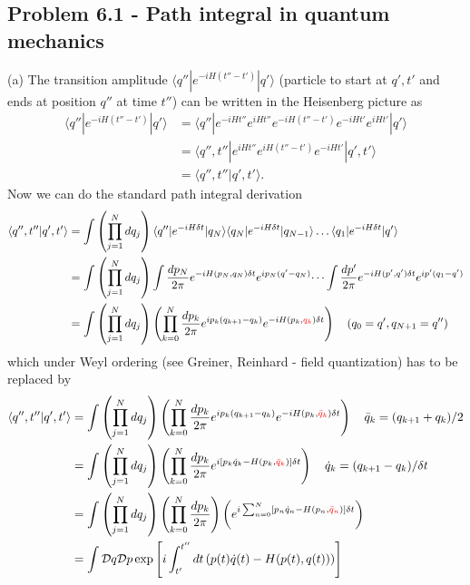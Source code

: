\documentclass[../main.tex]{subfiles}
\begin{document}
\subsection{Problem 6.1 - Path integral in quantum mechanics}
(a) The transition amplitude $\langle q''|e^{-iH(t''-t')}|q'\rangle$ (particle to start at $q',t'$ and ends at position $q''$ at time $t''$) can be written in the Heisenberg picture as
\begin{align}
    \langle q''|e^{-iH(t''-t')}|q'\rangle
    &=\langle q''|e^{-iHt''}e^{iHt''}e^{-iH(t''-t')}e^{-iHt'}e^{iHt'}|q'\rangle\\
    &=\langle q'',t''|e^{iHt''}e^{iH(t''-t')}e^{-iHt'}|q',t'\rangle\\
    &=\langle q'',t''|q',t'\rangle.
\end{align}
Now we can do the standard path integral derivation
\begin{align}
    \langle q'',t''|q',t'\rangle
    &=\int\left(\prod_{j=1}^N dq_j\right) \langle q''|e^{-iH\delta t}|q_N\rangle \langle q_N|e^{-iH\delta t}|q_{N-1}\rangle \dots \langle q_1|e^{-iH\delta t}|q'\rangle\\
    &=\int\left(\prod_{j=1}^N dq_j\right) \int\frac{dp_N}{2\pi}e^{-iH(p_N,q_N)\delta t}e^{ip_N(q'-q_N)} \dots  \int\frac{dp'}{2\pi}e^{-iH(p',q')\delta t}e^{ip'(q_1-q')}\\
    &=\int\left(\prod_{j=1}^N dq_j\right)\left(\prod_{k=0}^{N}\frac{dp_k}{2\pi} e^{ip_k(q_{k+1}-q_k)}e^{-iH(p_k,\textcolor{red}{q_k})\delta t}\right)\quad(q_0=q',q_{N+1}=q'')
\end{align}
which under Weyl ordering (see Greiner, Reinhard - field quantization) has to be replaced by
\begin{align}
    \langle q'',t''|q',t'\rangle
    &=\int\left(\prod_{j=1}^N dq_j\right)\left(\prod_{k=0}^{N}\frac{dp_k}{2\pi} e^{ip_k(q_{k+1}-q_k)}e^{-iH(p_k,\textcolor{red}{\bar{q}_k})\delta t}\right)\quad \bar{q}_k=(q_{k+1}+q_k)/2\\
    &=\int\left(\prod_{j=1}^N dq_j\right)\left(\prod_{k=0}^{N}\frac{dp_k}{2\pi} e^{i[p_k\dot{q}_k-H(p_k,\textcolor{red}{\bar{q}_k})]\delta t}\right)\quad \dot{q}_k=(q_{k+1}-q_k)/{\delta t}\\
    &=\int\left(\prod_{j=1}^N dq_j\right)\left(\prod_{k=0}^{N}\frac{dp_k}{2\pi}\right) \left(e^{i\sum_{n=0}^N[p_n\dot{q}_n-H(p_n,\textcolor{red}{\bar{q}_n})]\delta t}\right)\\
    &=\int\mathcal{D}q\mathcal{D}p\exp\left[i\int_{t'}^{t''}dt\left(p(t)\dot{q}(t)-H(p(t),q(t))\right)\right]
\end{align}
\end{document}
